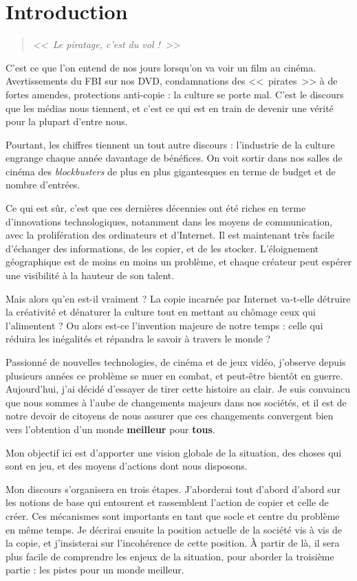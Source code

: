 \chapter*{Introduction}

\begin{quote}
{\Large \textit{<<~Le piratage, c'est du vol !~>>}}
\end{quote}

C'est ce que l'on entend de nos jours lorsqu'on va voir un film au cinéma.
Avertissements du FBI sur nos DVD, condamnations des <<~pirates~>> à de fortes amendes, protections anti-copie : la culture se porte mal.
C'est le discours que les médias nous tiennent, et c'est ce qui est en train de devenir une vérité pour la plupart d'entre nous.

Pourtant, les chiffres tiennent un tout autre discours : l'industrie de la culture engrange chaque année davantage de bénéfices.
On voit sortir dans nos salles de cinéma des \textit{blockbusters} de plus en plus gigantesques en terme de budget et de nombre d'entrées.

Ce qui est sûr, c'est que ces dernières décennies ont été riches en terme d'innovations technologiques, notamment dans les moyens de communication, avec la prolifération des ordinateurs et d'Internet.
Il est maintenant très facile d'échanger des informations, de les copier, et de les stocker.
L'éloignement géographique est de moins en moins un problème, et chaque créateur peut espérer une visibilité à la hauteur de son talent.

Mais alors qu'en est-il vraiment ?
La copie incarnée par Internet va-t-elle détruire la créativité et dénaturer la culture tout en mettant au chômage ceux qui l'alimentent ?
Ou alors est-ce l'invention majeure de notre temps : celle qui réduira les inégalités et répandra le savoir à travers le monde ?

Passionné de nouvelles technologies, de cinéma et de jeux vidéo, j'observe depuis plusieurs années ce problème se muer en combat, et peut-être bientôt en guerre.
Aujourd'hui, j'ai décidé d'essayer de tirer cette histoire au clair.
Je suis convaincu que nous sommes à l'aube de changements majeurs dans nos sociétés, et il est de notre devoir de citoyens de nous assurer que ces changements convergent bien vers l'obtention d'un monde \textbf{meilleur} pour \textbf{tous}.

Mon objectif ici est d'apporter une vision globale de la situation, des choses qui sont en jeu, et des moyens d'actions dont nous disposons.

Mon discours s'organisera en trois étapes.
J'aborderai tout d'abord d'abord sur les notions de base qui entourent et rassemblent l'action de copier et celle de créer.
Ces mécanismes sont importants en tant que socle et centre du problème en même temps.
Je décrirai ensuite la position actuelle de la société vis à vis de la copie, et j'insisterai sur l'incohérence de cette position.
À partir de là, il sera plus facile de comprendre les enjeux de la situation, pour aborder la troisième partie : les pistes pour un monde meilleur.
